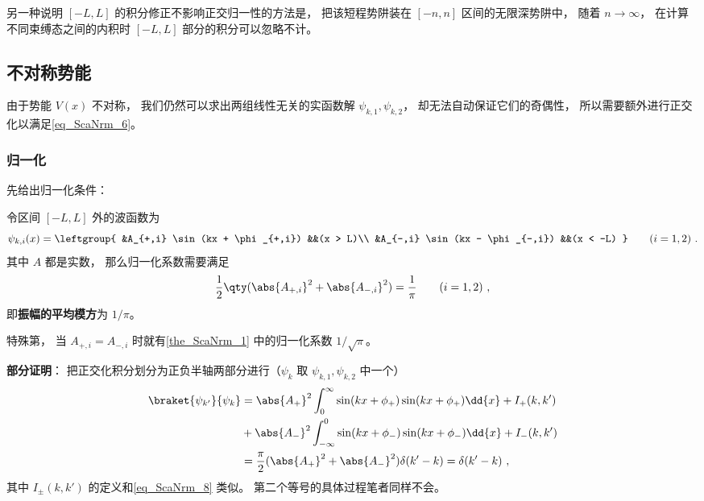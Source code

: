 另一种说明 $[-L,L]$ 的积分修正不影响正交归一性的方法是， 把该短程势阱装在 $[-n,n]$ 区间的无限深势阱中， 随着 $n\to\infty$， 在计算不同束缚态之间的内积时 $[-L,L]$ 部分的积分可以忽略不计。

\subsection{不对称势能}
由于势能 $V(x)$ 不对称， 我们仍然可以求出两组线性无关的实函数解 $\psi_{k,1},\psi_{k,2}$， 却无法自动保证它们的奇偶性， 所以需要额外进行正交化以满足\autoref{eq_ScaNrm_6}。
\subsubsection{归一化}
先给出归一化条件：
\begin{theorem}{}
令区间 $[-L,L]$ 外的波函数为
\begin{equation}\label{eq_ScaNrm_9}
\psi_{k,i}(x) = \leftgroup{
    &A_{+,i} \sin(kx + \phi_{+,i}) &&(x > L)\\
    &A_{-,i} \sin(kx - \phi_{-,i}) &&(x < -L)
} \qquad (i = 1,2)~.
\end{equation}
其中 $A$ 都是实数， 那么归一化系数需要满足
\begin{equation}\label{eq_ScaNrm_4}
\frac{1}{2}\qty(\abs{A_{+,i}}^2 + \abs{A_{-,i}}^2) = \frac{1}{\pi} \qquad (i = 1,2)~,
\end{equation}
即\textbf{振幅的平均模方}为 $1/\pi$。
\end{theorem}
特殊第， 当 $A_{+,i} = A_{-,i}$ 时就有\autoref{the_ScaNrm_1} 中的归一化系数 $1/\sqrt{\pi}$。

\textbf{部分证明}： 把正交化积分划分为正负半轴两部分进行（$\psi_{k}$ 取 $\psi_{k,1}, \psi_{k,2}$ 中一个）
\begin{equation}
\begin{aligned}
\braket{\psi_{k'}}{\psi_{k}} &=
\abs{A_+}^2\int_0^{\infty} \sin(kx + \phi_{+})\sin(kx + \phi_{+}) \dd{x}   + I_+(k,k')\\
&+ \abs{A_-}^2\int_{-\infty}^0 \sin(kx + \phi_{-})\sin(kx + \phi_{-}) \dd{x} + I_-(k,k')\\
&= \frac{\pi}{2}(\abs{A_+}^2 + \abs{A_-}^2)\delta(k'-k) = \delta(k'-k)~,
\end{aligned}
\end{equation}
其中 $I_{\pm}(k,k')$ 的定义和\autoref{eq_ScaNrm_8} 类似。 第二个等号的具体过程笔者同样不会。

